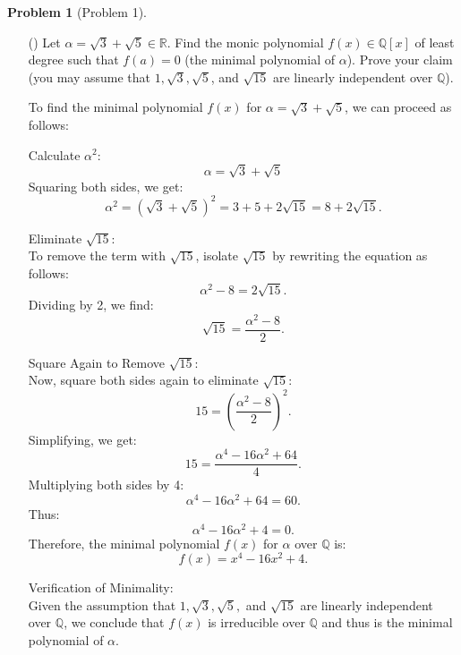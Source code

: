\documentclass[12pt]{article}
\theoremstyle{definition}
\newtheorem{problem}{Problem}
\newcounter{subq}[problem]
\newenvironment{subproblem}
{\refstepcounter{subq} \begin{itemize} \item[(\alph{subq})]}
{\end{itemize} \medskip}
\begin{document}
\begin{problem} [Problem 1] \phantom{.}

    \begin{subproblem}
        Let $\alpha = \sqrt{3} + \sqrt{5} \in \mathbb{R}$. Find the monic polynomial $f(x) \in \mathbb{Q}[x]$
        of least degree such that $f(a) = 0$ (the minimal polynomial of $\alpha$). Prove your claim (you may
        assume that $1, \sqrt{3}, \sqrt{5}$, and $\sqrt{15}$ are linearly independent over $\mathbb{Q}$).

        \begin{solution}
            To find the minimal polynomial \( f(x) \) for \( \alpha = \sqrt{3} + \sqrt{5} \), we can proceed as follows:

            Calculate \( \alpha^2 \):
            \[
            \alpha = \sqrt{3} + \sqrt{5}
            \]
            Squaring both sides, we get:
            \[
            \alpha^2 = (\sqrt{3} + \sqrt{5})^2 = 3 + 5 + 2\sqrt{15} = 8 + 2\sqrt{15}.
            \]

            Eliminate \( \sqrt{15} \):\\
            To remove the term with \( \sqrt{15} \), isolate \( \sqrt{15} \) by rewriting the equation as follows:
            \[
            \alpha^2 - 8 = 2\sqrt{15}.
            \]
            Dividing by 2, we find:
            \[
            \sqrt{15} = \frac{\alpha^2 - 8}{2}.
            \]

            Square Again to Remove \( \sqrt{15} \):\\
            Now, square both sides again to eliminate \( \sqrt{15} \):
            \[
            15 = \left( \frac{\alpha^2 - 8}{2} \right)^2.
            \]
            Simplifying, we get:
            \[
            15 = \frac{\alpha^4 - 16\alpha^2 + 64}{4}.
            \]
            Multiplying both sides by 4:
            \[
            \alpha^4 - 16\alpha^2 + 64 = 60.
            \]
            Thus:
            \[
            \alpha^4 - 16\alpha^2 + 4 = 0.
            \]
            Therefore, the minimal polynomial \( f(x) \) for \( \alpha \) over \( \mathbb{Q} \) is:
            \[
            f(x) = x^4 - 16x^2 + 4.
            \]

            Verification of Minimality:\\
            Given the assumption that \( 1, \sqrt{3}, \sqrt{5}, \) and \( \sqrt{15} \) are linearly independent over \( \mathbb{Q} \), we conclude that \( f(x) \) is irreducible over \( \mathbb{Q} \) and thus is the minimal polynomial of \( \alpha \).



\end{solution}
\end{subproblem}
\end{problem}
\end{document}
